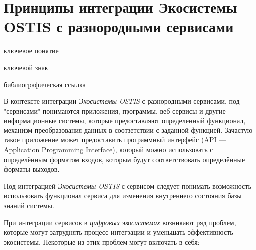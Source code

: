 \section{Принципы интеграции Экосистемы OSTIS с разнородными сервисами}
{\label{sec_integration_services}} 

\begin{SCn}

    \bigskip
    
    \begin{scnrelfromlist}{ключевое понятие}
    \end{scnrelfromlist}
    
    \bigskip
    
    \begin{scnrelfromlist}{ключевой знак}
    \end{scnrelfromlist}
    
    \bigskip
    
    \begin{scnrelfromlist}{библиографическая ссылка}
    \end{scnrelfromlist}
    
\end{SCn}

В контексте интеграции \textit{Экосистемы OSTIS} с разнородными сервисами, под "сервисами" понимаются приложения, программы, веб-сервисы и другие информационные системы, которые предоставляют определенный функционал, механизм преобразования данных в соответствии с заданной функцией. Зачастую такое приложение может предоставить программный интерфейс (API --- Application Programming Interface), который можно использовать с определённым форматом входов, которым будут соответствовать определённые форматы выходов.

Под интеграцией \textit{Экосистемы OSTIS} с сервисом следует понимать возможность использовать функционал сервиса для изменения внутреннего состояния базы знаний системы. 

При интеграции сервисов в \textit{цифровых экосистемах} возникают ряд проблем, которые могут затруднять процесс интеграции и уменьшать эффективность экосистемы. Некоторые из этих проблем могут включать в себя:

